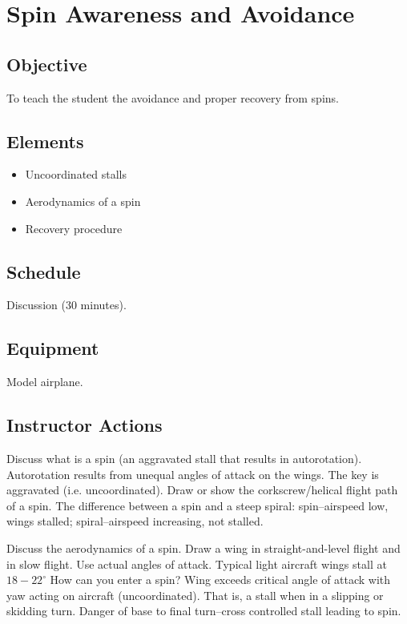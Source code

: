 \section{Spin Awareness and Avoidance}

\subsection{Objective}

To teach the student the avoidance and proper recovery from spins.

\subsection{Elements}

\begin{itemize}
  \item Uncoordinated stalls
  \item Aerodynamics of a spin
  \item Recovery procedure
\end{itemize}

\subsection{Schedule}

Discussion (30 minutes).

\subsection{Equipment}

Model airplane.

\subsection{Instructor Actions}

Discuss what is a spin (an aggravated stall that results in autorotation).
Autorotation results from unequal angles of attack on the wings. The key is
aggravated (i.e. uncoordinated). Draw or show the corkscrew/helical flight path
of a spin. The difference between a spin and a steep spiral: spin--airspeed low,
wings stalled; spiral--airspeed increasing, not stalled.

Discuss the aerodynamics of a spin. Draw a wing in straight-and-level flight
and in slow flight. Use actual angles of attack. Typical light aircraft wings
stall at $18-22^{\circ}$ How can you enter a spin? Wing exceeds critical angle
of attack with yaw acting on aircraft (uncoordinated). That is, a stall when in
a slipping or skidding turn. Danger of base to final turn--cross controlled
stall leading to spin.

